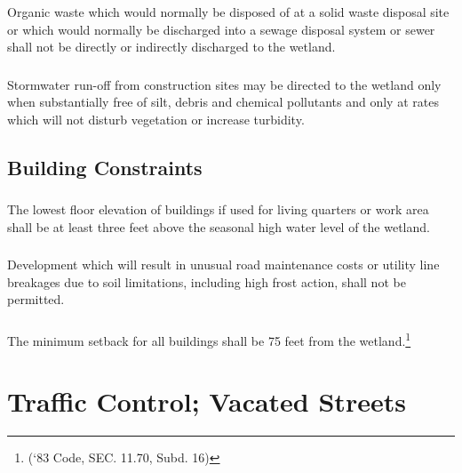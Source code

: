 \subsubsection{}
Organic waste which would normally be disposed of at a solid waste disposal site or which would normally be discharged into a sewage disposal system or sewer shall not be directly or indirectly discharged to the wetland.
\subsubsection{}
Stormwater run-off from construction sites may be directed to the wetland only when substantially free of silt, debris and chemical pollutants and only at rates which will not disturb vegetation or increase turbidity.
\subsection{Building Constraints}
\subsubsection{}
The lowest floor elevation of buildings if used for living quarters or work area shall be at least three feet above the seasonal high water level of the wetland.
\subsubsection{}
Development which will result in unusual road maintenance costs or utility line breakages due to soil limitations, including high frost action, shall not be permitted.
\subsubsection{}
The minimum setback for all buildings shall be 75 feet from the wetland.\footnote{(‘83 Code, SEC. 11.70, Subd. 16)}
\section{Traffic Control; Vacated Streets}
